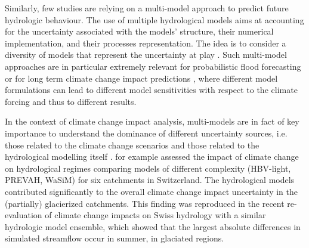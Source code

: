 \documentclass[10pt,a4paper]{article}
\begin{document}
Similarly, few studies are relying on a multi-model approach to predict future hydrologic behaviour. The use of multiple hydrological models aims at accounting for the uncertainty associated with the models' structure, their numerical implementation, and their processes representation. The idea is to 
consider a diversity of models that represent the uncertainty at play \citep{Babel2019}. Such multi-model approaches are in particular extremely relevant for probabilistic flood forecasting \citep{Kauffeldt2016} or for long term climate change impact predictions \citep{Kobierska2011, Kobierska2013,Andrianaki2019}, where different model formulations can lead to different model sensitivities with respect to the climate forcing and thus to different results. 


In the context of climate change impact analysis, multi-models are in fact of key importance to understand the dominance of different uncertainty sources, i.e. those related to the climate change scenarios and those related to the hydrological modelling itself \citet{Bosshard2013a}. 
\citet{Addor2014} for example assessed the impact of climate change on hydrological regimes 
comparing models of different complexity (HBV-light, PREVAH, WaSiM) for six catchments in Switzerland. The hydrological models contributed significantly to the overall climate change impact uncertainty in the (partially) glacierized catchments. This finding was reproduced in the recent re-evaluation of climate change impacts on Swiss hydrology \citep[Hydro-CH2018][]{FOEN2021} with a similar hydrologic model ensemble, which showed that the largest absolute differences in simulated streamflow occur in summer, in glaciated regions.
\end{document}
